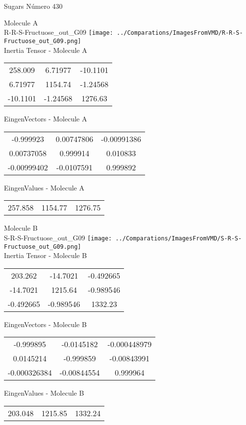 \vtab[-2cm]
\begin{center}
{\large Sugars \tab Número 430}
\end{center}
\begin{multicols}{2}
\begin{center}

Molecule A \\ 
R-R-S-Fructuose\_out\_G09
\texttt{[image: ../Comparations/ImagesFromVMD/R-R-S-Fructuose\_out\_G09.png]}
\\
Inertia Tensor - Molecule A \\
\vtab

\begin{tabular}{|c c c|}
258.009	 & 	6.71977	 & 	-10.1101	 \\
6.71977	 & 	1154.74	 & 	-1.24568	 \\
-10.1101	 & 	-1.24568	 & 	1276.63
\end{tabular}

\vtab
 EingenVectors - Molecule A     \\
\vtab
\begin{tabular}{|c c c|}
-0.999923	 & 	0.00747806	 & 	-0.00991386	 \\
0.00737058	 & 	0.999914	 & 	0.010833	 \\
-0.00999402	 & 	-0.0107591	 & 	0.999892
\end{tabular}

\vtab
 EingenValues - Molecule A     \\
\vtab
\begin{tabular}{|c c c|}
257.858	 & 	1154.77	 & 	1276.75	 \\
\end{tabular}
\columnbreak

Molecule B \\ 
S-R-S-Fructuose\_out\_G09
\texttt{[image: ../Comparations/ImagesFromVMD/S-R-S-Fructuose\_out\_G09.png]}
\\
Inertia Tensor - Molecule B \\
\vtab

\begin{tabular}{|c c c|}
203.262	 & 	-14.7021	 & 	-0.492665	 \\
-14.7021	 & 	1215.64	 & 	-0.989546	 \\
-0.492665	 & 	-0.989546	 & 	1332.23
\end{tabular}

\vtab
 EingenVectors - Molecule B     \\
\vtab
\begin{tabular}{|c c c|}
-0.999895	 & 	-0.0145182	 & 	-0.000448979	 \\
0.0145214	 & 	-0.999859	 & 	-0.00843991	 \\
-0.000326384	 & 	-0.00844554	 & 	0.999964
\end{tabular}

\vtab
 EingenValues - Molecule B     \\
\vtab
\begin{tabular}{|c c c|}
203.048	 & 	1215.85	 & 	1332.24	 \\
\end{tabular}

\end{center}
\end{multicols}
